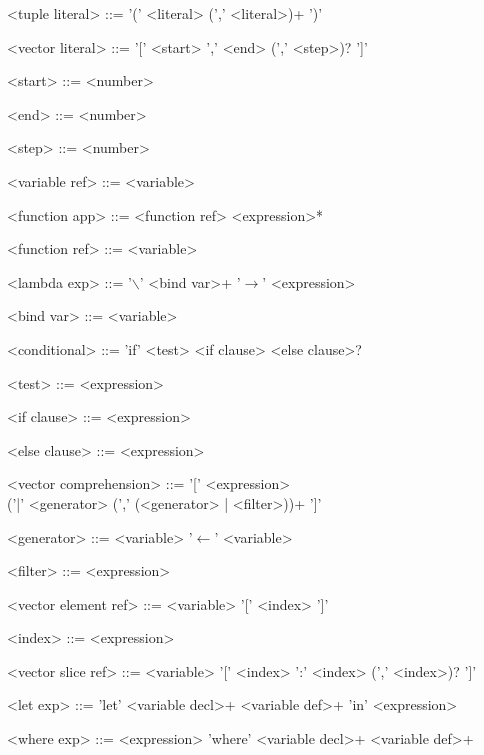 \begin{grammar}
<tuple literal>  ::=    '(' <literal> (',' <literal>)+ ')'

<vector literal> ::=    '[' <start> ',' <end> (',' <step>)? ']'

<start>          ::=    <number>

<end>            ::=    <number>

<step>           ::=    <number>

<variable ref>   ::=    <variable>

<function app>   ::=    <function ref> <expression>*

<function ref>   ::=    <variable>

<lambda exp>     ::=    '$\backslash$' <bind var>+ '$\to$' <expression>

<bind var>       ::=    <variable>

<conditional>    ::=    'if' <test> <if clause> <else clause>?

<test>           ::=    <expression>

<if clause>      ::=    <expression>

<else clause>    ::=    <expression>

<vector comprehension>
                 ::=    '[' <expression> \\('|' <generator> (',' (<generator> | <filter>))+ ']'

<generator>      ::=    <variable> '$\gets$' <variable>

<filter>         ::=    <expression>

<vector element ref>
                 ::=    <variable> '[' <index> ']'

<index>          ::=    <expression>

<vector slice ref>
                 ::=    <variable> '[' <index> ':' <index> (',' <index>)? ']'

<let exp>        ::=    'let' <variable decl>+ <variable def>+ 'in' <expression>

<where exp>      ::=    <expression> 'where' <variable decl>+ <variable def>+
\end{grammar}

